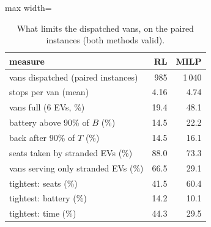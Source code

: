 \begin{table}[H]\centering
\caption{What limits the dispatched vans, on the paired instances (both methods valid).}\label{tab:vans}
\begin{adjustbox}{max width=\textwidth}\begin{tabular}{lrr}\toprule
measure & RL & MILP \\ \midrule
vans dispatched (paired instances) & 985 & 1\,040 \\
stops per van (mean) & 4.16 & 4.74 \\
vans full (6 EVs, \%) & 19.4 & 48.1 \\
battery above 90\% of $B$ (\%) & 14.5 & 22.2 \\
back after 90\% of $T$ (\%) & 14.5 & 16.1 \\
seats taken by stranded EVs (\%) & 88.0 & 73.3 \\
vans serving only stranded EVs (\%) & 66.5 & 29.1 \\
tightest: seats (\%) & 41.5 & 60.4 \\
tightest: battery (\%) & 14.2 & 10.1 \\
tightest: time (\%) & 44.3 & 29.5 \\
\bottomrule\end{tabular}\end{adjustbox}\end{table}
